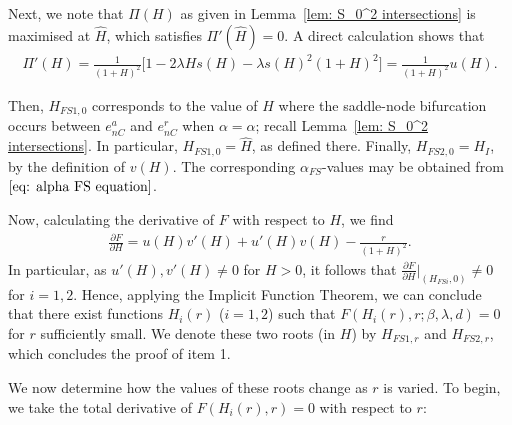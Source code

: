 \documentclass{article}
\theoremstyle{definition}
\numberwithin{equation}{section}
\begin{document}
Next, we note that $\Pi(H)$ as given in Lemma~\ref{lem: S_0^2 intersections} is maximised at $\hat{H}$, which satisfies $\Pi'(\hat{H})=0$. A direct calculation shows that
\begin{align*}
    \Pi'(H) = \frac{1}{(1+H)^2}\big[1-2\lambda H s(H)-\lambda s(H)^2(1+H)^2\big] = \frac{1}{(1+H)^2}u(H).
\end{align*}

Then, $H_{FS1,0}$ corresponds to the value of $H$ where the saddle-node bifurcation occurs between $e^{a}_{nC}$ and $e^{r}_{nC}$ when $\alpha=\hat\alpha$; recall Lemma~\ref{lem: S_0^2 intersections}. In particular, $H_{FS1,0}= \hat{H}$, as defined there. Finally, $H_{FS2,0}=H_I$, by the definition of $v(H)$. The corresponding $\alpha_{FS}$-values may be obtained from $\eqref{eq: alpha FS equation}$. 

Now, calculating the derivative of $F$ with respect to $H$, we find 
\begin{align}
    \frac{\partial F}{\partial H} = u (H)v'(H) + u'(H)v(H) -\frac{r}{(1+H)^2}.
    \label{eq: F deriv x equation}
\end{align}
In particular, as $u'(H),v'(H)\neq 0$ for $H>0$, it follows that $\frac{\partial F}{\partial H}\rvert_{(H_{FSi},0)}\neq 0$ for $i=1,2$. Hence, applying the Implicit Function Theorem, we can conclude that there exist functions $H_i(r)$ ($i=1,2$) such that $F(H_i(r),r;\beta,\lambda,d)=0$ for $r$ sufficiently small. We denote these two roots (in $H$) by $H_{FS1,r}$ and $H_{FS2,r}$, which concludes the proof of item 1.

We now determine how the values of these roots change as $r$ is varied. To begin, we take the total derivative of $F(H_i(r),r)=0$ with respect to $r$:
\end{document}
